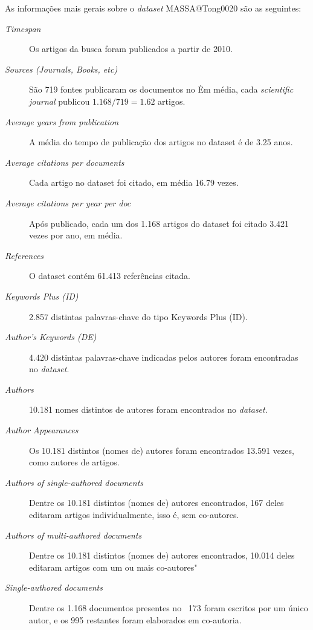 
As informações mais gerais sobre o \textit{dataset} MASSA@Tong0020 são as seguintes:
\begin{description}
    \item[\textit{Timespan}] Os artigos da busca foram publicados a partir de 2010.
    \item [\textit{Sources (Journals, Books, etc)}] São 719 fontes publicaram os documentos no \dataset\. Em média, cada \textit{scientific journal} publicou $1.168/719=1.62$ artigos.
     \item [\textit{Average years from publication}] A média do tempo de publicação dos artigos no dataset é de 3.25 anos.
     \item [\textit{Average citations per documents}] Cada artigo no dataset foi citado, em média 16.79 vezes.
     \item [\textit{Average citations per year per doc}] Após publicado, cada um dos 1.168 artigos do dataset foi citado 3.421 vezes por ano, em média.
    \item [\textit{References}] O dataset contém 61.413 referências citada.
    \item [\textit{Keywords Plus (ID)}] 2.857 distintas palavras-chave do tipo Keywords Plus (ID).
    \item [\textit{Author's Keywords (DE)}] 4.420 distintas palavras-chave indicadas pelos autores foram encontradas no \textit{dataset}.
     \item [\textit{Authors}] 10.181 nomes distintos de autores foram encontrados no \textit{dataset}.
    \item [\textit{Author Appearances}] Os 10.181 distintos (nomes de) autores foram encontrados 13.591 vezes, como autores de artigos.
    \item [\textit{Authors of single-authored documents}] Dentre os 10.181 distintos (nomes de) autores encontrados, 167 deles editaram artigos individualmente, isso é, sem co-autores.
    \item [\textit{Authors of multi-authored documents}] Dentre os 10.181 distintos (nomes de) autores encontrados, 10.014 deles editaram artigos com um ou mais co-autores"
    \item [\textit{Single-authored documents}] Dentre os 1.168 documentos presentes no \dataset\, 173 foram escritos por um único autor, e os 995 restantes foram elaborados em co-autoria.

\end{description}
